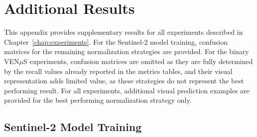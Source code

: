 \chapter{Additional Results}
\label{chap:appendix}

This appendix provides supplementary results for all experiments described in Chapter~\ref{chap:experiments}. For the Sentinel-2 model training, confusion matrices for the remaining normalization strategies are provided. For the binary VEN$\mu$S experiments, confusion matrices are omitted as they are fully determined by the recall values already reported in the metrics tables, and their visual representation adds limited value, as these strategies do not represent the best performing result. For all experiments, additional visual prediction examples are provided for the best performing normalization strategy only.

\section{Sentinel-2 Model Training}
\label{app:s2}


